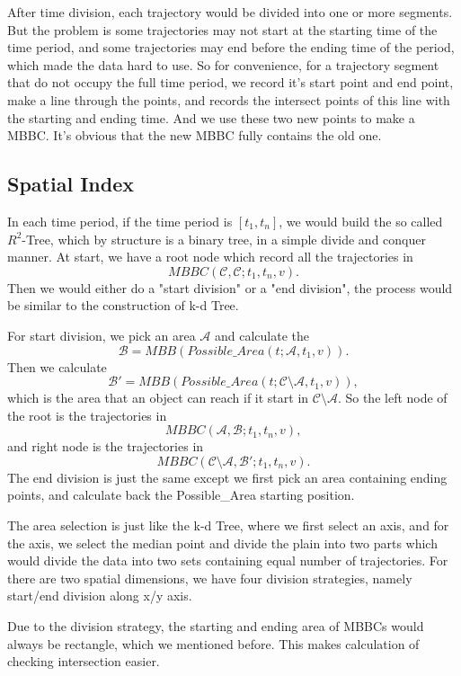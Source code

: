 \documentclass[sigplan]{acmart}
\begin{document}
After time division, each trajectory would be divided into one or more segments. But the problem is some trajectories may not start at the starting time of the time period, and some trajectories may end before the ending time of the period, which made the data hard to use. So for convenience, for a trajectory segment that do not occupy the full time period, we record it's start point and end point, make a line through the points, and records the intersect points of this line with the starting and ending time. And we use these two new points to make a MBBC. It's obvious that the new MBBC fully contains the old one.

\subsection{Spatial Index}
In each time period, if the time period is $[t_1,t_n]$, we would build the so called $R^2$-Tree, which by structure is a binary tree, in a simple divide and conquer manner. At start, we have a root node which record all the trajectories in $$MBBC(\mathcal{C},\mathcal{C};t_1,t_n,v).$$ Then we would either do a "start division" or a "end division", the process would be similar to the construction of k-d Tree.\par

For start division, we pick an area $\mathcal{A}$ and calculate the $$\mathcal{B}=MBB(Possible\_Area(t;\mathcal{A},t_1,v)).$$
Then we calculate $$\mathcal{B'}=MBB(Possible\_Area(t;\mathcal{C} \setminus \mathcal{A},t_1,v)),$$
which is the area that an object can reach if it start in $\mathcal{C}\setminus \mathcal{A}$. So the left node of the root is the trajectories in $$MBBC(\mathcal{A},\mathcal{B};t_1,t_n,v),$$ and right node is the trajectories in $$MBBC(\mathcal{C}\setminus \mathcal{A},\mathcal{B'};t_1,t_n,v).$$ The end division is just the same except we first pick an area containing ending points, and calculate back the Possible\_Area starting position.\par

The area selection is just like the k-d Tree, where we first select an axis, and for the axis, we select the median point and divide the plain into two parts which would divide the data into two sets containing equal number of trajectories. For there are two spatial dimensions, we have four division strategies, namely start/end division along x/y axis.\par

Due to the division strategy, the starting and ending area of MBBCs would always be rectangle, which we mentioned before. This makes calculation of checking intersection easier.
\end{document}
